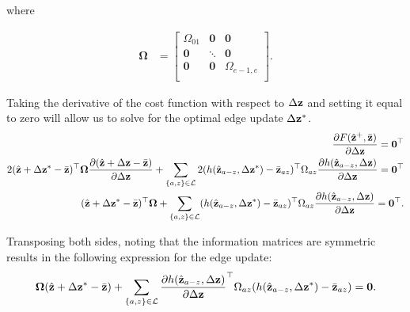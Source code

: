 where

\begin{align*}
  \boldsymbol{\Omega} &= \left[\begin{array}{ccc}
  \Omega_{01} & \mathbf{0} & \mathbf{0} \\
  \mathbf{0}  & \ddots     & \mathbf{0} \\
  \mathbf{0}  & \mathbf{0} & \Omega_{e-1,e}\\
  \end{array}\right].
\end{align*}

Taking the derivative of the cost function with respect to $\Delta\mathbf{z}$ and setting it equal to zero will allow us to solve for the optimal edge update $\Delta\mathbf{z}^*$.
\begin{align*}
  \dfrac{\partial F(\hat{\mathbf{z}}^+,\bar{\mathbf{z}})}{\partial \Delta\mathbf{z}} = \mathbf{0}^\top \\
  2 (\hat{\mathbf{z}}+\Delta\mathbf{z}^*-\bar{\mathbf{z}})^\top \boldsymbol{\Omega} \frac{\partial (\hat{\mathbf{z}}+\Delta\mathbf{z}-\bar{\mathbf{z}})}{\partial \Delta\mathbf{z}}
    + \sum_{\{a,z\} \in \mathcal{L}} 2
  (h(\hat{\mathbf{z}}_{a-z},\Delta\mathbf{z}^*)-\bar{\mathbf{z}}_{az})^\top \Omega_{az}
  \frac{\partial h(\hat{\mathbf{z}}_{a-z},\Delta\mathbf{z})}{\partial \Delta\mathbf{z}}
  = \mathbf{0}^\top
  \\
  (\hat{\mathbf{z}}+\Delta\mathbf{z}^*-\bar{\mathbf{z}})^\top \boldsymbol{\Omega}
  + \sum_{\{a,z\} \in \mathcal{L}}
  (h(\hat{\mathbf{z}}_{a-z},\Delta\mathbf{z}^*)-\bar{\mathbf{z}}_{az})^\top \Omega_{az}
  \frac{\partial h(\hat{\mathbf{z}}_{a-z},\Delta\mathbf{z})}{\partial \Delta\mathbf{z}}
  = \mathbf{0}^\top.
\end{align*}

Transposing both sides, noting that the information matrices are symmetric results in the following expression for the edge update:
\begin{align}
  \boldsymbol{\Omega} (\hat{\mathbf{z}}+\Delta\mathbf{z}^*-\bar{\mathbf{z}})
  + \sum_{\{a,z\} \in \mathcal{L}}
  \frac{\partial h(\hat{\mathbf{z}}_{a-z},\Delta\mathbf{z})}{\partial \Delta\mathbf{z}}^\top \Omega_{az} (h(\hat{\mathbf{z}}_{a-z},\Delta\mathbf{z}^*)-\bar{\mathbf{z}}_{az})
  = \mathbf{0}.
  \label{eq:edge_update}
\end{align}

